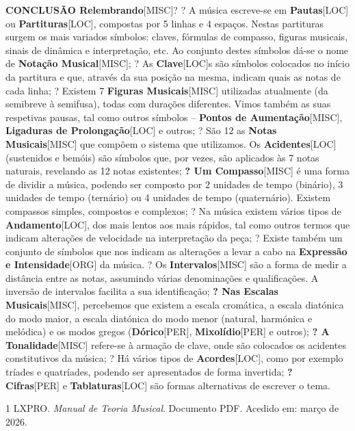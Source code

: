 \documentclass[a4paper,12pt]{article}
\begin{document}
\textbf{CONCLUSÃO Relembrando}\textsc{[MISC]}? ? A música escreve-se em \textbf{Pautas}\textsc{[LOC]} ou \textbf{Partituras}\textsc{[LOC]}, compostas por 5 linhas e 4 espaços. Nestas partituras surgem os mais variados símbolos: claves, fórmulas de compasso, figuras musicais, sinais de dinâmica e interpretação, etc. Ao conjunto destes símbolos dá-se o nome de \textbf{Notação Musical}\textsc{[MISC]}; ? As \textbf{Clave}\textsc{[LOC]}s são símbolos colocados no início da partitura e que, através da sua posição na mesma, indicam quais as notas de cada linha; ? Existem 7 \textbf{Figuras Musicais}\textsc{[MISC]} utilizadas atualmente (da semibreve à semifusa), todas com durações diferentes. Vimos também as suas respetivas pausas, tal como outros símbolos -- \textbf{Pontos de Aumentação}\textsc{[MISC]}, \textbf{Ligaduras de Prolongação}\textsc{[LOC]} e outros; ? São 12 as \textbf{Notas Musicais}\textsc{[MISC]} que compõem o sistema que utilizamos. Os \textbf{Acidentes}\textsc{[LOC]} (sustenidos e bemóis) são símbolos que, por vezes, são aplicados às 7 notas naturais, revelando as 12 notas existentes; \textbf{? Um Compasso}\textsc{[MISC]} é uma forma de dividir a música, podendo ser composto por 2 unidades de tempo (binário), 3 unidades de tempo (ternário) ou 4 unidades de tempo (quaternário). Existem compassos simples, compostos e complexos; ? Na música existem vários tipos de \textbf{Andamento}\textsc{[LOC]}, dos mais lentos aos mais rápidos, tal como outros termos que indicam alterações de velocidade na interpretação da peça; ? Existe também um conjunto de símbolos que nos indicam as alterações a levar a cabo na \textbf{Expressão e Intensidade}\textsc{[ORG]} da música. ? Os \textbf{Intervalos}\textsc{[MISC]} são a forma de medir a distância entre as notas, assumindo várias denominações e qualificações. A inversão de intervalos facilita a sua identificação; \textbf{? Nas Escalas Musicais}\textsc{[MISC]}, percebemos que existem a escala cromática, a escala diatónica do modo maior, a escala diatónica do modo menor (natural, harmónica e melódica) e os modos gregos (\textbf{Dórico}\textsc{[PER]}, \textbf{Mixolídio}\textsc{[PER]} e outros); \textbf{? A Tonalidade}\textsc{[MISC]} refere-se à armação de clave, onde são colocados os acidentes constitutivos da música; ? Há vários tipos de \textbf{Acordes}\textsc{[LOC]}, como por exemplo tríades e quatríades, podendo ser apresentados de forma invertida; \textbf{? Cifras}\textsc{[PER]} e \textbf{Tablaturas}\textsc{[LOC]} são formas alternativas de escrever o tema.


\begin{thebibliography}{1}
LXPRO.
\textit{Manual de Teoria Musical}.
Documento PDF. Acedido em: março de 2026.
\end{thebibliography}
\end{document}
